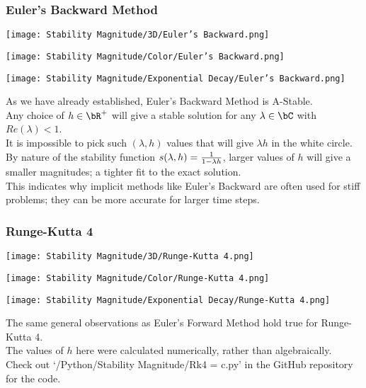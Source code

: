 \subsubsection{Euler's Backward Method}
\begin{multicols}{2}
	\begin{center}
	\texttt{[image: Stability Magnitude/3D/Euler's Backward.png]}
	\end{center}
	\columnbreak{}
	\begin{center}
	\texttt{[image: Stability Magnitude/Color/Euler's Backward.png]}
	\end{center}
\end{multicols}
\begin{multicols}{2}
	\begin{center}
		\texttt{[image: Stability Magnitude/Exponential Decay/Euler's Backward.png]}
	\end{center}
	\columnbreak{}
	As we have already established, Euler's Backward Method is A-Stable.\\
	Any choice of $h \in \bR^{+}$ will give a stable solution for any $\lambda \in \bC$ with $Re(\lambda) < 1$.\\
	It is impossible to pick such $(\lambda, h)$ values that will give $\lambda h$ in the white circle.\\
	By nature of the stability function $s(\lambda, h) = \frac{1}{1 - \lambda h}$, larger values of $h$ will give a smaller magnitudes; a tighter fit to the exact solution.\\
	This indicates why implicit methods like Euler's Backward are often used for stiff problems; they can be more accurate for larger time steps.\\
\end{multicols}

\subsubsection{Runge-Kutta 4}
\begin{multicols}{2}
	\begin{center}
	\texttt{[image: Stability Magnitude/3D/Runge-Kutta 4.png]}
	\end{center}
	\columnbreak{}
	\begin{center}
	\texttt{[image: Stability Magnitude/Color/Runge-Kutta 4.png]}
	\end{center}
\end{multicols}
\begin{multicols}{2}
	\begin{center}
		\texttt{[image: Stability Magnitude/Exponential Decay/Runge-Kutta 4.png]}
	\end{center}
	\columnbreak{}
	The same general observations as Euler's Forward Method hold true for Runge-Kutta 4.\\
	The values of $h$ here were calculated numerically, rather than algebraically.\\
	Check out `/Python/Stability Magnitude/Rk4 = c.py' in the GitHub repository~\cite{GitHub_Repo} for the code.\\
\end{multicols}
